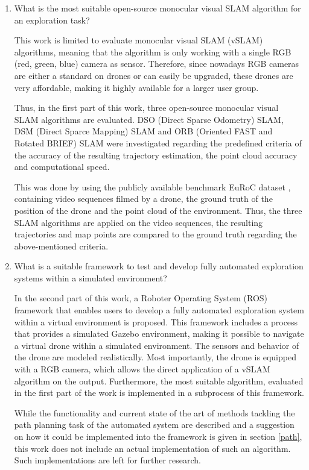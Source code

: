  \begin{enumerate}
 \item{What is the most suitable open-source monocular visual SLAM algorithm for an exploration task?}
 
 
  This work is limited to evaluate monocular visual SLAM (vSLAM) algorithms, meaning that the algorithm is only working
 with a single RGB (red, green, blue) camera as sensor. Therefore, since nowadays RGB cameras are either a standard on drones or can easily be upgraded,
 these drones are very affordable, making it highly available for a larger user group. 
 
 
 Thus, in the first part of this work, three open-source monocular visual SLAM algorithms are evaluated. 
  DSO (Direct Sparse Odometry) SLAM, DSM (Direct Sparce Mapping) SLAM and ORB (Oriented FAST and Rotated BRIEF)
 SLAM were investigated regarding the predefined criteria of the accuracy of the resulting trajectory estimation, the point cloud accuracy and computational speed. 
 
 This was done by using the publicly available benchmark EuRoC dataset \cite{euroc}, containing video sequences filmed by a drone, the 
 ground truth of the position of the drone and the point cloud of the environment. Thus, the three SLAM algorithms are applied on the 
 video sequences, the resulting trajectories and map points are compared to the ground truth regarding the above-mentioned criteria.

 \item{What is a suitable framework to test and develop fully automated exploration systems within a simulated environment?}
 
 
 In the second part of this work, a Roboter Operating System (ROS) framework that enables users to develop a fully automated exploration system within 
 a virtual environment is proposed. This framework includes a process that provides a simulated Gazebo environment, making it possible to navigate 
 a virtual drone within a simulated environment. The sensors and behavior of the drone are modeled realistically. Most importantly, the drone is equipped with a RGB 
 camera, which allows the direct application of a vSLAM algorithm on the output. 
 Furthermore, the most suitable algorithm, evaluated in the first part of the work is implemented in a subprocess of this framework. 
 
 While the functionality and current state of the art of methods tackling the path planning task of the automated system are described and a suggestion on how it could 
 be implemented into the framework is given in section \ref{path}, this work does not include an actual implementation of such an algorithm. 
 Such implementations are left for further research. 
 

\end{enumerate}

